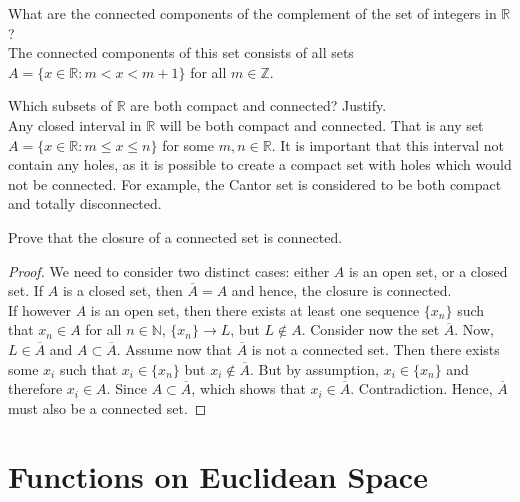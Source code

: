 \documentclass[12pt]{book}
\newcommand{\N}{\mathbb{N}}
\newcommand{\Z}{\mathbb{Z}}
\newcommand{\R}{\mathbb{R}}
\newenvironment{exercise}[2][Exercise]{\begin{trivlist}
\item[\hskip \labelsep {\bfseries #1}\hskip \labelsep {\bfseries #2.}]}{\end{trivlist}}
\begin{document}
\begin{exercise}{7.2.7}
\begin{exercise}{7.5.5}
What are the connected components of the complement of the set of integers in $\R$? \\

The connected components of this set consists of all sets $A = \{ x \in \R : m < x < m+1 \}$ for all $m \in \Z$.
\end{exercise}



\begin{exercise}{7.5.7}
Which subsets of $\R$ are both compact and connected? Justify. \\

Any closed interval in $\R$ will be both compact and connected. That is any set $A= \{ x \in \R : m \leq x \leq n \}$ for some $m, n \in \R$. It is important that this interval not contain any holes, as it is possible to create a compact set with holes which would not be connected. For example,  the Cantor set is considered to be both compact and totally disconnected.
\end{exercise}


\begin{exercise}{7.5.10}
Prove that the closure of a connected set is connected.

\begin{proof}
We need to consider two distinct cases: either $A$ is an open set, or a closed set. If $A$ is a closed set, then $\overline{A} = A$ and hence, the closure is connected. \\
If however $A$ is an open set, then there exists at least one sequence $\{x_n\}$ such that $x_n \in A$ for all $n \in \N$, $\{x_n \} \to L$, but $L \notin A$. Consider now the set $\overline{A}$. Now, $L \in \overline{A}$ and $A \subset \overline{A}$. Assume now that $\overline{A}$ is not a connected set. Then there exists some $x_i$ such that $x_i \in \{x_n\}$ but $x_i \notin \overline{A}$. But by assumption, $x_i \in \{x_n\}$ and therefore $x_i \in A$. Since $A \subset \overline{A}$, which shows that $x_i \in \overline{A}$. Contradiction. Hence, $\overline{A}$ must also be a connected set.
\end{proof}
\end{exercise}





\chapter{Functions on Euclidean Space}

\end{exercise}
\end{document}
